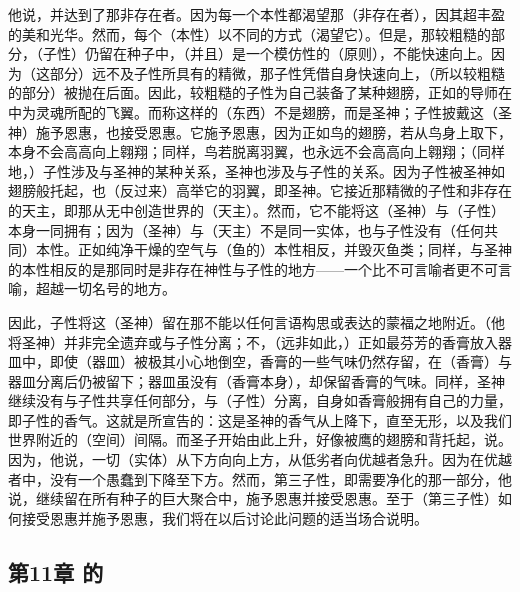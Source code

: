 他说，并达到了那非存在者。因为每一个本性都渴望那（非存在者），因其超丰盈的美和光华。然而，每个（本性）以不同的方式（渴望它）。但是，那较粗糙的部分，（子性）仍留在种子中，（并且）是一个模仿性的（原则），不能快速向上。因为（这部分）远不及子性所具有的精微，那子性凭借自身快速向上，（所以较粗糙的部分）被抛在后面。因此，较粗糙的子性为自己装备了某种翅膀，正如的导师在中为灵魂所配的飞翼。而称这样的（东西）不是翅膀，而是圣神；子性披戴这（圣神）施予恩惠，也接受恩惠。它施予恩惠，因为正如鸟的翅膀，若从鸟身上取下，本身不会高高向上翱翔；同样，鸟若脱离羽翼，也永远不会高高向上翱翔；（同样地，）子性涉及与圣神的某种关系，圣神也涉及与子性的关系。因为子性被圣神如翅膀般托起，也（反过来）高举它的羽翼，即圣神。它接近那精微的子性和非存在的天主，即那从无中创造世界的（天主）。然而，它不能将这（圣神）与（子性）本身一同拥有；因为（圣神）与（天主）不是同一实体，也与子性没有（任何共同）本性。正如纯净干燥的空气与（鱼的）本性相反，并毁灭鱼类；同样，与圣神的本性相反的是那同时是非存在神性与子性的地方——一个比不可言喻者更不可言喻，超越一切名号的地方。\par

因此，子性将这（圣神）留在那不能以任何言语构思或表达的蒙福之地附近。（他将圣神）并非完全遗弃或与子性分离；不，（远非如此，）正如最芬芳的香膏放入器皿中，即使（器皿）被极其小心地倒空，香膏的一些气味仍然存留，在（香膏）与器皿分离后仍被留下；器皿虽没有（香膏本身），却保留香膏的气味。同样，圣神继续没有与子性共享任何部分，与（子性）分离，自身如香膏般拥有自己的力量，即子性的香气。这就是所宣告的：这是圣神的香气从上降下，直至无形，以及我们世界附近的（空间）间隔。而圣子开始由此上升，好像被鹰的翅膀和背托起，说。因为，他说，一切（实体）从下方向向上方，从低劣者向优越者急升。因为在优越者中，没有一个愚蠢到下降至下方。然而，第三子性，即需要净化的那一部分，他说，继续留在所有种子的巨大聚合中，施予恩惠并接受恩惠。至于（第三子性）如何接受恩惠并施予恩惠，我们将在以后讨论此问题的适当场合说明。\par


\subsection{第11章 的}


